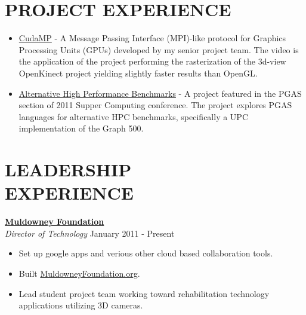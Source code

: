 \documentclass[margin]{res}
\begin{document}
\begin{resume}
\section{PROJECT EXPERIENCE}
\vspace{-1mm}
  \begin{itemize}
    \item \href{https://github.com/KurtRudolph/CudaMP/raw/master/Paper/CS493-RockwellCollins-FinalPaper.pdf}{CudaMP} - A Message Passing Interface (MPI)-like protocol for Graphics Processing Units (GPUs) developed by my senior project team. The video is the application of the project performing the rasterization of the 3d-view OpenKinect project yielding slightly faster results than OpenGL.
    \item \href{http://kurtrudolph.net/2012/10/11/alternative-high-performance-benchmarks/}{Alternative High Performance Benchmarks} - A project featured in the PGAS section of 2011 Supper Computing conference.  The project explores PGAS languages for alternative HPC benchmarks, specifically a UPC implementation of the Graph 500.
  \end{itemize}
\section{LEADERSHIP \\ EXPERIENCE}  
  {\bf \href{http://www.muldowneyfoundation.org/}{Muldowney Foundation}}\\
  {\sl Director of Technology} \hfill January 2011 - Present
\vspace{-5mm}
    \begin{itemize}
      \itemsep -2pt %
      \item Set up google apps and verious other cloud based collaboration tools.
      \item Built \href{http://www.muldowneyfoundation.org/}{MuldowneyFoundation.org}.
      \item Lead student project team working toward
          rehabilitation technology applications utilizing 3D cameras.
    \end{itemize}


\end{resume}
\end{document}
